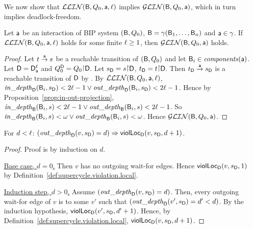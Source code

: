 \vspace{0.5ex}

\noindent
We now show that $\mathcal{LLIN}(\mathsf{B}, Q_0, \mathsf{a}, \ell)$ implies $\mathcal{GLIN}(\mathsf{B}, Q_0, \mathsf{a})$, which in turn implies deadlock-freedom.  

\begin{lemma}
\label{lemma:loc-implies-glob}
\label{lemma:locLinear-implies-globlinear}
\label{LLinGLin}
Let $\mathsf{a}$ be an interaction of BIP system $(\mathsf{B}, Q_0)$, \ie $\mathsf{B} = \gamma(\mathsf{B}_1,\dots,\mathsf{B}_n)$ and $\mathsf{a} \in \gamma$.
If $\mathcal{LLIN}(\mathsf{B}, Q_0, \mathsf{a}, \ell)$ holds for some finite $\ell \ge 1$, then $\mathcal{GLIN}(\mathsf{B}, Q_0, \mathsf{a})$ holds.
\end{lemma}
%
\begin{proof}
Let $t \stackrel{\mathsf{a}}{\rightarrow} s$ be a reachable transition of $(\mathsf{B}, Q_0)$ and let $\mathsf{B}_i \in \mathit{components}(\mathsf{a})$.
Let $\mathsf{D} = \mathsf{D}_{\mathsf{a}}^{\ell}$ and $\QDS = Q_0 \pj \DS$.
Let $\sD = s \pj \DS$, $\tD = t \pj \DS$.
Then $t_\mathsf{D} \stackrel{\mathsf{a}}{\rightarrow} s_\mathsf{D}$ is a reachable transition of $\mathsf{D}$ by .
By $\mathcal{LLIN}(\mathsf{B}, Q_0, \mathsf{a}, \ell)$, 
$\mathit{in\_depth}_{\mathsf{D}}({\mathsf{B}_i, s_\mathsf{D}}) < 2\ell-1 \lor \mathit{out\_depth}_{\mathsf{D}}({\mathsf{B}_i, s_\mathsf{D}}) < 2\ell-1$.
Hence by Proposition~\ref{prop:in-out-projection},
$\mathit{in\_depth}_{\mathsf{B}}({\mathsf{B}_i, s}) < 2\ell-1 \lor \mathit{out\_depth}_{\mathsf{B}}({\mathsf{B}_i, s}) < 2\ell-1$.
So
$\mathit{in\_depth}_{\mathsf{B}}({\mathsf{B}_i, s}) < \omega \lor \mathit{out\_depth}_{\mathsf{B}}({\mathsf{B}_i, s}) < \omega$.
Hence $\mathcal{GLIN}(\mathsf{B}, Q_0, \mathsf{a})$.
\end{proof}








\begin{proposition}
\label{prop:finOutDepth-Implies-locScViol}
For $d < \ell$: $(\mathit{out\_depth}_{\mathsf{D}}({v, s_\mathsf{D}}) = d)  \Rightarrow \mathsf{violLoc}_{\mathsf{D}}(v,s_\mathsf{D},d+1)$.
\end{proposition}
%
\begin{proof}
Proof is by induction on $d$. 

\vspace{1.0ex}
\ul{Base case, $d=0$.}
Then $v$ has no outgoing wait-for edges. Hence $\mathsf{violLoc}_{\mathsf{D}}(v,s_\mathsf{D},1)$ by Definition~\ref{def:supercycle.violation.local}.

\vspace{1.0ex}
\ul{Induction step, $d > 0$.}
Assume $(\mathit{out\_depth}_{\mathsf{D}}({v, s_\mathsf{D}}) = d)$. Then, every outgoing wait-for edge of $v$ is to some $v'$ such that 
$(\mathit{out\_depth}_{\mathsf{D}}({v', s_\mathsf{D}}) = d' < d)$. By the induction hypothesis, $\mathsf{violLoc}_{\mathsf{D}}(v',s_\mathsf{D},d'+1)$.
Hence, by Definition~\ref{def:supercycle.violation.local},  $\mathsf{violLoc}_{\mathsf{D}}(v,s_\mathsf{D},d+1)$.
\end{proof}


